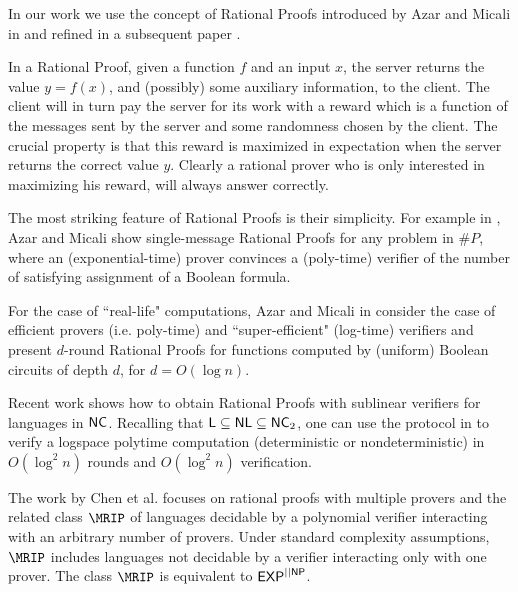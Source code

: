 In our work we use the concept of {\sf Rational Proofs} introduced by Azar and Micali in \cite{am} and refined in a subsequent paper \cite{am1}. 

In a Rational Proof, given a function $f$ and an input $x$, the server returns the value $y=f(x)$, and (possibly) some auxiliary information, to the client. The client will in turn 
pay the server for its work with a reward which is a function of the messages 
sent by the server and some randomness chosen by the client.  The crucial 
property is that this reward is maximized in expectation when the server 
returns the correct value $y$. Clearly a rational prover who is only interested 
in maximizing his reward, will always answer correctly. 

The most striking feature of Rational Proofs is their simplicity. For example in \cite{am}, Azar and Micali show {\sf single-message} Rational Proofs for any problem in $\#P$, where an (exponential-time) prover convinces a (poly-time) verifier of the number of satisfying assignment of a Boolean formula. 

For the case of  ``real-life" computations, Azar and Micali in \cite{am1} consider the case of efficient provers (i.e. poly-time) and ``super-efficient" (log-time) verifiers and present $d$-round Rational Proofs for functions computed by (uniform) Boolean circuits of depth $d$, for $d=O(\log n)$. 

Recent work \cite{ratsumchecks} shows how to obtain Rational Proofs with sublinear verifiers for languages in ${\mathsf{NC}}$. Recalling that ${\mathsf{L}} \subseteq {\ensuremath{\mathsf{NL}}} \subseteq {\ensuremath{\mathsf{NC}}}_2$, one can use the protocol  in \cite{ratsumchecks} to verify a logspace polytime computation (deterministic or nondeterministic) in $O(\log^2 n )$ rounds and $O(\log^2 n )$ verification.

The work by Chen et al. \cite{chen2016rational} focuses on rational proofs with multiple provers and the related class $\MRIP$ of languages decidable by a polynomial verifier interacting with an arbitrary number of provers. Under standard complexity assumptions, $\MRIP$ includes languages not decidable by a verifier interacting only with one prover. The class $\MRIP$ is equivalent to ${\mathsf{EXP}}^{||{\mathsf{NP}}}$.


